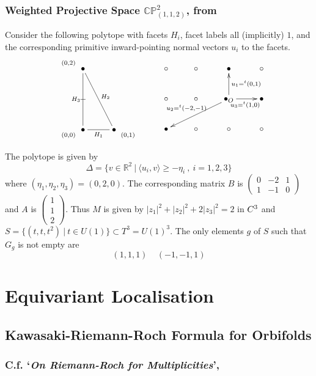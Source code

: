 \documentclass{article}
\newcommand{\PP}{\mathbb{P}}
\newcommand{\RR}{\mathbb{R}}
\newcommand{\CC}{\mathbb{C}}
\begin{document}
	\subsubsection{Weighted Projective Space $\CC\PP^2_{(1,1,2)}$, from \cite{Holm2012}}
	Consider the following polytope with facets $H_i$, facet labels all (implicitly) $1$, and the corresponding primitive inward-pointing normal vectors $u_i$ to the facets.{\tiny
		\[
		\xymatrix{ 
			\ar@{}[r]^{(0,2)}&\bullet\ar@{-}[dd]_{H_3}\ar@{-}[rdd]^{H_2}&&\\
			&-&&\\
			\ar@{}[r]_{(0,0)}&\bullet\ar@{-}[r]_{H_1}&\bullet \ar@{}[r]_{(0,1)}&
		}
		\ \ \ \ \ \ 
		\xymatrix{
			\circ&\circ&\bullet&\circ\\
			\circ&\circ&\bullet_O\ar[u]_{u_1=^t(0,1) }\ar[r]_{u_3=^t(1,0) }\ar[dll]_{u_2=^t(-2,-1)}&\bullet\\
			\bullet&\circ&\circ&\circ
		}
		\]
	}
	
	
	The polytope is given by $$\Delta=\{v \in \RR^2 \ |\ \langle u_i, v \rangle \geq -\eta_i\ ,\ i=1,2,3 \}$$ where $(\eta_1,\eta_2,\eta_3)=(0,2,0)$. The corresponding matrix $B$ is {\small $\left(\begin{array}{ccc} 0&-2&1 \\ 1&-1&0 \end{array}\right)$} and $A$ is {\small $\left(\begin{array}{c} 1\\ 1\\2 \end{array}\right)$}. Thus $M$ is given by $|z_1|^2 + |z_2|^2 + 2|z_3|^2=2$ in $\\C^3$ and $S = \{(t,t,t^2) \ |\ t \in U(1)\} \subset T^{3} = U(1)^3$. The only elements $g$ of $S$ such that $G_g$ is not empty are
	\[
	(1,1,1) \ \ \ \ \ (-1,-1,1)
	\]
	

	
	\section{Equivariant Localisation}
	
	\subsection{Kawasaki-Riemann-Roch Formula for Orbifolds}\label{subsec:KRR}
	
	\subsubsection{C.f. `\emph{On Riemann-Roch for Multiplicities}', \cite{Meinrenken1996}}\label{subsubsec:Meinrenken1996}
	
\end{document}
